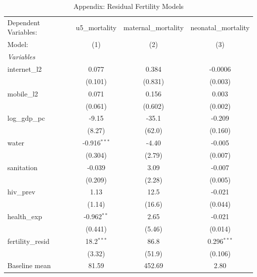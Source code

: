 \begin{table}[htbp]
   \caption{\label{tab:appendix_residual_fertility} Appendix: Residual Fertility Models}
   \centering
   \begin{tabular}{lccc}
      \tabularnewline \midrule \midrule
      Dependent Variables: & u5\_mortality  & maternal\_mortality  & neonatal\_mortality\\   
      Model:               & (1)            & (2)                  & (3)\\  
      \midrule
      \emph{Variables}\\
      internet\_l2         & 0.077          & 0.384                & -0.0006\\   
                           & (0.101)        & (0.831)              & (0.003)\\   
      mobile\_l2           & 0.071          & 0.156                & 0.003\\   
                           & (0.061)        & (0.602)              & (0.002)\\   
      log\_gdp\_pc         & -9.15          & -35.1                & -0.209\\   
                           & (8.27)         & (62.0)               & (0.160)\\   
      water                & -0.916$^{***}$ & -4.40                & -0.005\\   
                           & (0.304)        & (2.79)               & (0.007)\\   
      sanitation           & -0.039         & 3.09                 & -0.007\\   
                           & (0.209)        & (2.28)               & (0.005)\\   
      hiv\_prev            & 1.13           & 12.5                 & -0.021\\   
                           & (1.14)         & (16.6)               & (0.044)\\   
      health\_exp          & -0.962$^{**}$  & 2.65                 & -0.021\\   
                           & (0.441)        & (5.46)               & (0.014)\\   
      fertility\_resid     & 18.2$^{***}$   & 86.8                 & 0.296$^{***}$\\   
                           & (3.32)         & (51.9)               & (0.106)\\   
      Baseline mean        & 81.59          & 452.69               & 2.80\\  

\end{tabular}
\end{table}
